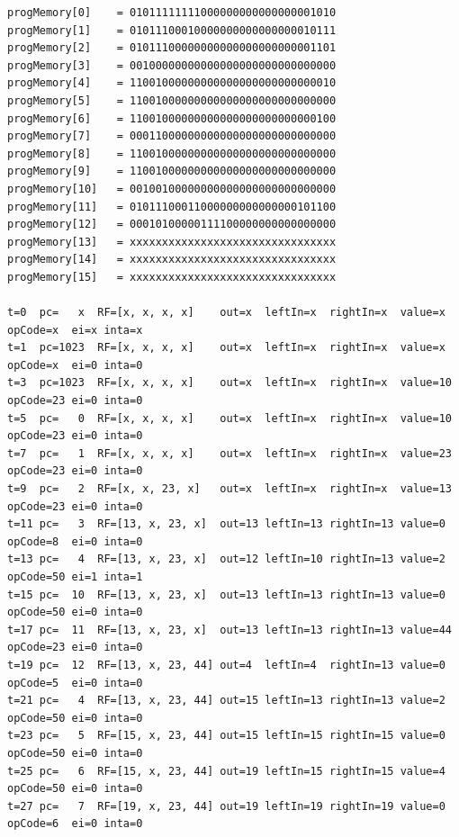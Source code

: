 {\footnotesize
\begin{verbatim}
progMemory[0]    = 01011111111000000000000000001010
progMemory[1]    = 01011100010000000000000000010111
progMemory[2]    = 01011100000000000000000000001101
progMemory[3]    = 00100000000000000000000000000000
progMemory[4]    = 11001000000000000000000000000010
progMemory[5]    = 11001000000000000000000000000000
progMemory[6]    = 11001000000000000000000000000100
progMemory[7]    = 00011000000000000000000000000000
progMemory[8]    = 11001000000000000000000000000000
progMemory[9]    = 11001000000000000000000000000000
progMemory[10] 	 = 00100100000000000000000000000000
progMemory[11] 	 = 01011100011000000000000000101100
progMemory[12] 	 = 00010100000111100000000000000000
progMemory[13] 	 = xxxxxxxxxxxxxxxxxxxxxxxxxxxxxxxx
progMemory[14] 	 = xxxxxxxxxxxxxxxxxxxxxxxxxxxxxxxx
progMemory[15] 	 = xxxxxxxxxxxxxxxxxxxxxxxxxxxxxxxx

t=0  pc=   x  RF=[x, x, x, x]    out=x  leftIn=x  rightIn=x  value=x  opCode=x  ei=x inta=x
t=1  pc=1023  RF=[x, x, x, x]    out=x  leftIn=x  rightIn=x  value=x  opCode=x  ei=0 inta=0
t=3  pc=1023  RF=[x, x, x, x]    out=x  leftIn=x  rightIn=x  value=10 opCode=23 ei=0 inta=0
t=5  pc=   0  RF=[x, x, x, x]    out=x  leftIn=x  rightIn=x  value=10 opCode=23 ei=0 inta=0
t=7  pc=   1  RF=[x, x, x, x]    out=x  leftIn=x  rightIn=x  value=23 opCode=23 ei=0 inta=0
t=9  pc=   2  RF=[x, x, 23, x]   out=x  leftIn=x  rightIn=x  value=13 opCode=23 ei=0 inta=0
t=11 pc=   3  RF=[13, x, 23, x]  out=13 leftIn=13 rightIn=13 value=0  opCode=8  ei=0 inta=0
t=13 pc=   4  RF=[13, x, 23, x]  out=12 leftIn=10 rightIn=13 value=2  opCode=50 ei=1 inta=1
t=15 pc=  10  RF=[13, x, 23, x]  out=13 leftIn=13 rightIn=13 value=0  opCode=50 ei=0 inta=0
t=17 pc=  11  RF=[13, x, 23, x]  out=13 leftIn=13 rightIn=13 value=44 opCode=23 ei=0 inta=0
t=19 pc=  12  RF=[13, x, 23, 44] out=4  leftIn=4  rightIn=13 value=0  opCode=5  ei=0 inta=0
t=21 pc=   4  RF=[13, x, 23, 44] out=15 leftIn=13 rightIn=13 value=2  opCode=50 ei=0 inta=0
t=23 pc=   5  RF=[15, x, 23, 44] out=15 leftIn=15 rightIn=15 value=0  opCode=50 ei=0 inta=0
t=25 pc=   6  RF=[15, x, 23, 44] out=19 leftIn=15 rightIn=15 value=4  opCode=50 ei=0 inta=0
t=27 pc=   7  RF=[19, x, 23, 44] out=19 leftIn=19 rightIn=19 value=0  opCode=6  ei=0 inta=0
\end{verbatim}
} 